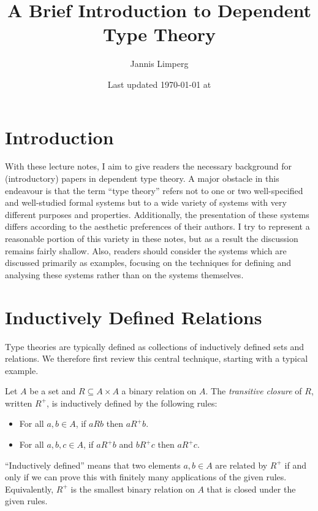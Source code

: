\documentclass{article}
\theoremstyle{definition}
\begin{document}
\title{A Brief Introduction to Dependent Type Theory}
\author{Jannis Limperg}
\date{Last updated \today{} at \currenttime}
\maketitle

\section{Introduction}

With these lecture notes, I aim to give readers the necessary background for (introductory) papers in dependent type theory.
A major obstacle in this endeavour is that the term \enquote{type theory} refers not to one or two well-specified and well-studied formal systems but to a wide variety of systems with very different purposes and properties.
Additionally, the presentation of these systems differs according to the aesthetic preferences of their authors.
I try to represent a reasonable portion of this variety in these notes, but as a result the discussion remains fairly shallow.
Also, readers should consider the systems which are discussed primarily as examples, focusing on the techniques for defining and analysing these systems rather than on the systems themselves.

\section{Inductively Defined Relations}%
\label{sec:indrel}

Type theories are typically defined as collections of inductively defined sets and relations.
We therefore first review this central technique, starting with a typical example.

\begin{definition}
  Let $A$ be a set and $R ⊆ A × A$ a binary relation on $A$.
  The \emph{transitive closure} of $R$, written $R^{+}$, is inductively defined by the following rules:
  \begin{itemize}
    \item For all $a,b ∈ A$, if $aRb$ then $aR^{+}b$.
    \item For all $a,b,c ∈ A$, if $aR^{+}b$ and $bR^{+}c$ then $aR^{+}c$.
  \end{itemize}
\end{definition}

\enquote{Inductively defined} means that two elements $a,b ∈ A$ are related by $R^{+}$ if and only if we can prove this with finitely many applications of the given rules.
Equivalently, $R^{+}$ is the smallest binary relation on $A$ that is closed under the given rules.
\end{document}
